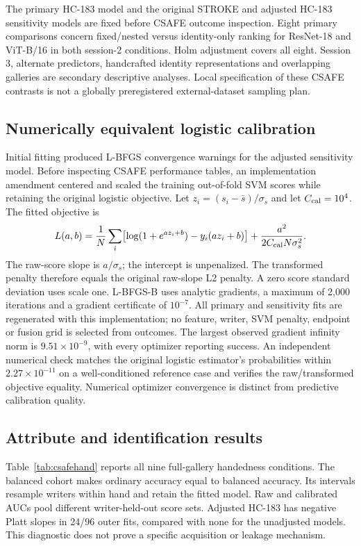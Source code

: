 \documentclass[10pt,a4paper]{article}
\begin{document}
The primary HC-183 model and the original STROKE and adjusted HC-183 sensitivity models are fixed before CSAFE outcome inspection. Eight primary comparisons concern fixed/nested versus identity-only ranking for ResNet-18 and ViT-B/16 in both session-2 conditions. Holm adjustment covers all eight. Session 3, alternate predictors, handcrafted identity representations and overlapping galleries are secondary descriptive analyses. Local specification of these CSAFE contrasts is not a globally preregistered external-dataset sampling plan.

\subsection{Numerically equivalent logistic calibration}
Initial fitting produced L-BFGS convergence warnings for the adjusted sensitivity model. Before inspecting CSAFE performance tables, an implementation amendment centered and scaled the training out-of-fold SVM scores while retaining the original logistic objective. Let $z_i=(s_i-\bar s)/\sigma_s$ and let $C_{\rm cal}=10^4$. The fitted objective is
\begin{equation}
L(a,b)=\frac1N\sum_i\bigl[\log(1+e^{a z_i+b})-y_i(a z_i+b)\bigr]+\frac{a^2}{2C_{\rm cal}N\sigma_s^2}.
\label{eq:csafecalibration}
\end{equation}
The raw-score slope is $a/\sigma_s$; the intercept is unpenalized. The transformed penalty therefore equals the original raw-slope L2 penalty. A zero score standard deviation uses scale one. L-BFGS-B uses analytic gradients, a maximum of 2,000 iterations and a gradient certificate of $10^{-7}$. All primary and sensitivity fits are regenerated with this implementation; no feature, writer, SVM penalty, endpoint or fusion grid is selected from outcomes. The largest observed gradient infinity norm is $9.51\times10^{-9}$, with every optimizer reporting success. An independent numerical check matches the original logistic estimator's probabilities within $2.27\times10^{-11}$ on a well-conditioned reference case and verifies the raw/transformed objective equality. Numerical optimizer convergence is distinct from predictive calibration quality.

\subsection{Attribute and identification results}
Table~\ref{tab:csafehand} reports all nine full-gallery handedness conditions. The balanced cohort makes ordinary accuracy equal to balanced accuracy. Its intervals resample writers within hand and retain the fitted model. Raw and calibrated AUCs pool different writer-held-out score sets. Adjusted HC-183 has negative Platt slopes in 24/96 outer fits, compared with none for the unadjusted models. This diagnostic does not prove a specific acquisition or leakage mechanism.
\end{document}
